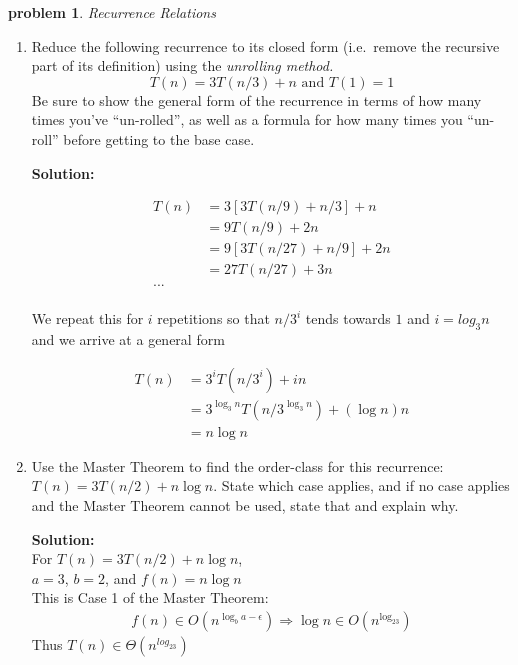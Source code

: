 \documentclass[10pt]{article}
\newtheorem{problem}{\sc\color{cit}problem}
\begin{document}
\begin{problem} Recurrence Relations \end{problem}
      \begin{enumerate}   
    
    	\item Reduce the following recurrence to its closed form (i.e.\ remove the recursive part of its definition) using the \emph{unrolling method.}
    	$$T(n) = 3 T(n/3) + n \textrm{ and } T(1) = 1$$
    	Be sure to show the general form of the recurrence in terms of how many times you've ``un-rolled'', as well as a formula for how many times you ``un-roll'' before getting to the base case.
    	
    	\textbf{Solution:}
    	
    	\begin{align*}
    	T(n) &= 3[3T(n/9) + n/3] + n \\
    	&= 9T(n/9) + 2n \\
    	&= 9[3T(n/27) + n/9] + 2n \\
    	&= 27T(n/27) + 3n \\
    	... \\
    	\end{align*}
    	
    	We repeat this for $i$ repetitions so that $n/3^i$ tends towards $1$ and $i = log_3n$ and we arrive at a general form
    	
    	\begin{align*}
    	T(n) &= 3^i T(n/3^i) + in \\
    	&= 3^{\log_3n}T(n/3^{\log_3n}) + (\log n)n \\
    	&= n\log n
    	\end{align*}

    	\item Use the Master Theorem to find the order-class for this recurrence: $T(n) = 3 T (n/2) + n \log n$.  State which case applies, and if no case applies and the Master Theorem cannot be used, state that and explain why.

        \textbf{Solution:} \\
        For $T(n) = 3T(n/2) + n \log n$, \\
        $a = 3$, $b = 2$, and $f(n) = n \log n$ \\
        This is Case 1 of the Master Theorem:
        \begin{align*}
            f(n) \in O(n^{\log_ba - \epsilon}) \Longrightarrow \log n \in O(n^{\log_23})
        \end{align*}
        Thus $T(n) \in \Theta(n^{log_23})$


\end{enumerate}
\end{document}
